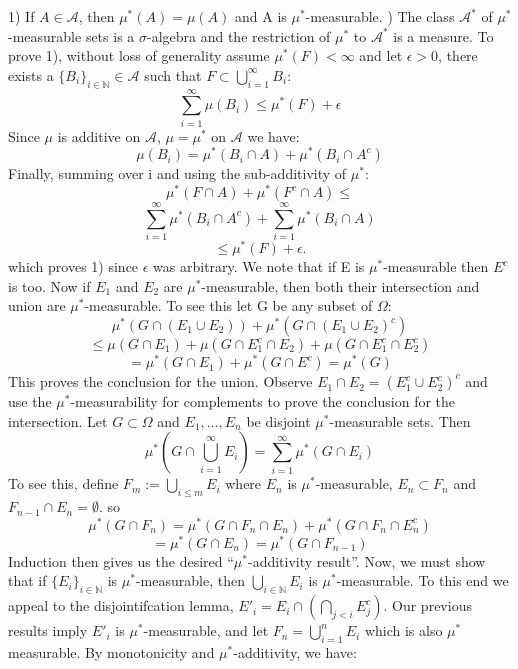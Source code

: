 \documentclass{article}
\begin{document}
1) If $A \in \mathcal{A}$, then $\mu^*(A) = \mu(A)$ and A is $\mu^*$-measurable. \newline {}) The class $\mathcal{A}^*$ of $\mu^*$-measurable sets is a $\sigma$-algebra and the restriction of $\mu^*$ to $\mathcal{A}^*$ is a measure. \newline \newline
To prove 1), without loss of generality assume $\mu^*(F) < \infty$ and let $\epsilon >0$, there exists a $\{B_i\}_{i \in \mathbb{N}} \in \mathcal{A}$ such that $F \subset \bigcup_{i=1}^{\infty}B_i$:
\[
\sum_{i=1}^{\infty}\mu(B_i) \leq \mu^*(F) + \epsilon
\]
Since $\mu$ is additive on $\mathcal{A}$, $\mu = \mu^*$ on $\mathcal{A}$ we have:
\[
\mu(B_i) = \mu^*(B_i\cap A) + \mu^*(B_i\cap A^c)
\]
Finally, summing over i and using the sub-additivity of $\mu^*$:
\[
\mu^*(F\cap A) + \mu^*(F^c\cap A) \leq
\]
\[
\sum_{i=1}^{\infty}\mu^*(B_i\cap A^c) + \sum_{i=1}^{\infty}\mu^*(B_i\cap A)
\]
\[
\leq \mu^*(F) + \epsilon.
\] which proves 1) since $\epsilon$ was arbitrary.  \newline \newline
We note that if E is $\mu^*$-measurable then $E^c$ is too. Now if $E_1$ and $E_2$ are $\mu^*$-measurable, then both their intersection and union are $\mu^*$-measurable. To see this let G be any subset of $\Omega$:
\[
\mu^*(G\cap(E_1\cup E_2)) + \mu^*(G\cap(E_1\cup E_2)^c)
\]
\[
\leq \mu(G\cap E_1) + \mu(G\cap E_1^c \cap E_2) + \mu(G\cap E_1^c \cap E_2^c)
\]
\[
=\mu^*(G\cap E_1)+ \mu^*(G \cap E^c) = \mu^*(G)
\]
This proves the conclusion for the union. Observe $E_1\cap E_2=(E_1^c\cup E_2^c)^c$ and use the $\mu^*$-measurability for complements to prove the conclusion for the intersection. \newline \newline
Let $G \subset \Omega$ and $E_1, \ldots, E_n$ be disjoint $\mu^*$-measurable sets. Then 
\[
\mu^*(G \cap \bigcup_{i=1}^{\infty}E_i) = \sum_{i=1}^{\infty}\mu^*(G \cap E_i)
\]
To see this, define $F_m:=\bigcup_{i\leq m} E_i$ where $E_n$ is $\mu^*$-measurable, $E_n \subset F_n$ and $F_{n-1}\cap E_n = \emptyset$. so 
\[
\mu^*(G\cap F_n) = \mu^*(G\cap F_n\cap E_n) + \mu^*(G\cap F_n\cap E_n^c)
\]
\[
=\mu^*(G\cap E_n) = \mu^*(G \cap F_{n-1})
\]
Induction then gives us the desired ``$\mu^*$-additivity result''. \newline \newline
Now, we must show that if $\{E_i\}_{i\in\mathbb{N}}$ is $\mu^*$-measurable, then $\bigcup_{i\in \mathbb{N}}E_i$ is $\mu^*$-measurable. To this end we appeal to the disjointifcation lemma, $E'_i = E_i \cap (\bigcap_{j<i}E_j^c)$. Our previous results imply $E'_i$ is $\mu^*$-measurable, and let $F_n = \bigcup_{i=1}^nE_i$ which is also $\mu^*$ measurable. By monotonicity and $\mu^*$-additivity, we have:
\end{document}
